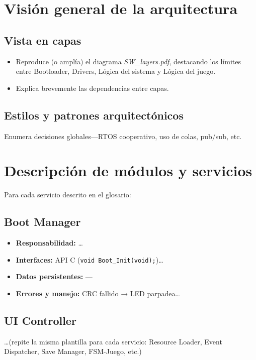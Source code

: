 \documentclass[11pt,a4paper]{article}
\begin{document}
\section{Visión general de la arquitectura}
\subsection{Vista en capas}
\begin{itemize}
  \item Reproduce (o amplía) el diagrama \textit{SW\_layers.pdf}, destacando los límites entre
        Bootloader, Drivers, Lógica del sistema y Lógica del juego.
  \item Explica brevemente las dependencias entre capas.
\end{itemize}

\subsection{Estilos y patrones arquitectónicos}
Enumera decisiones globales—RTOS cooperativo, uso de colas, pub/sub, etc.

\section{Descripción de módulos y servicios}
Para cada servicio descrito en el glosario:
\subsection{Boot Manager}
\begin{itemize}
  \item \textbf{Responsabilidad:} \ldots
  \item \textbf{Interfaces:} API C (\texttt{void Boot\_Init(void);})\ldots
  \item \textbf{Datos persistentes:} —
  \item \textbf{Errores y manejo:} CRC fallido → LED parpadea\ldots
\end{itemize}

\subsection{UI Controller}
\ldots (repite la misma plantilla para cada servicio: Resource Loader, Event Dispatcher, Save Manager, FSM-Juego, etc.)

\end{document}

